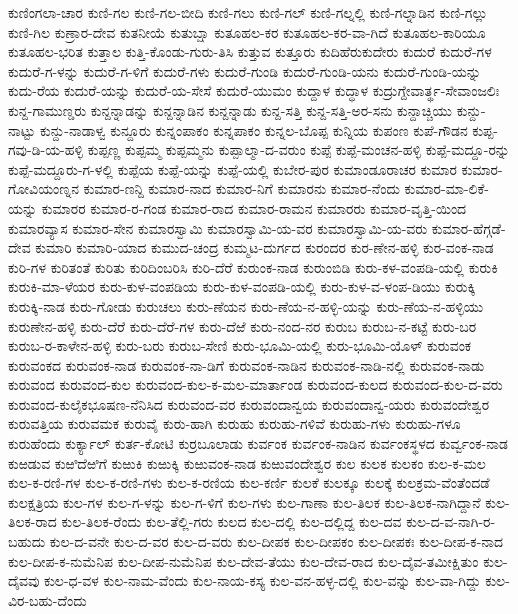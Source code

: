 ಕುಣಿಂಗಲಾ-ಚಾರ
ಕುಣಿ-ಗಲ
ಕುಣಿ-ಗಲ-ಬೀದಿ
ಕುಣಿ-ಗಲು
ಕುಣಿ-ಗಲ್
ಕುಣಿ-ಗಲ್ನಲ್ಲಿ
ಕುಣಿ-ಗಲ್ನಾಡಿನ
ಕುಣಿ-ಗಲ್ಲು
ಕುಣಿ-ಗಿಲ
ಕುಣ್ರಾರ-ದೇವ
ಕುತನೀಯೆ
ಕುತುಬ್ಷಾ
ಕುತೂಹಲ-ಕರ
ಕುತೂಹಲ-ಕರ-ವಾ-ಗಿದೆ
ಕುತೂಹಲ-ಕಾರಿಯೂ
ಕುತೂಹಲ-ಭರಿತ
ಕುತ್ತಾಲ
ಕುತ್ತಿ-ಕೊಂಡು-ಗುರು-ತಿಸಿ
ಕುತ್ತುವ
ಕುತ್ತೂರು
ಕುದಿಹೆರುಕುದೇರು
ಕುದುರೆ
ಕುದುರೆ-ಗಳ
ಕುದುರೆ-ಗ-ಳನ್ನು
ಕುದುರೆ-ಗ-ಳಿಗೆ
ಕುದುರೆ-ಗಳು
ಕುದುರೆ-ಗುಂಡಿ
ಕುದುರೆ-ಗುಂಡಿ-ಯನು
ಕುದುರೆ-ಗುಂಡಿ-ಯನ್ನು
ಕುದು-ರೆಯ
ಕುದುರೆ-ಯನ್ನು
ಕುದುರೆ-ಯ-ಸೇಸೆ
ಕುದುರೆ-ಯುಮಂ
ಕುದ್ದಾಳ
ಕುದ್ಧಾಳ
ಕುದ್ರುಗ್ದೇವಾರ್ತ್ಥ-ಸೇವಾಂಜಲಿಃ
ಕುನ್ದ-ಗಾಮುಣ್ಡರು
ಕುನ್ದನ್ನಾಡನ್ನು
ಕುನ್ದನ್ನಾಡಿನ
ಕುನ್ದನ್ನಾಡು
ಕುನ್ದ-ಸತ್ತಿ
ಕುನ್ದ-ಸತ್ತಿ-ಅರ-ಸನು
ಕುನ್ದಾಚ್ಚಿಯು
ಕುನ್ದು-ನಾಟ್ಟು
ಕುನ್ದು-ನಾಡಾಳ್ವ
ಕುನ್ದೂರು
ಕುನ್ನಂಪಾಕಂ
ಕುನ್ನಪಾಕಂ
ಕುನ್ನಲ-ಬೊಪ್ಪ
ಕುನ್ನಿಯ
ಕುಪಂಣ
ಕುಪೆ-ಗೌಡನ
ಕುಪ್ಪ-ಗವು-ಡಿ-ಯ-ಹಳ್ಳಿ
ಕುಪ್ಪಣ್ಣ
ಕುಪ್ಪಮ್ಮ
ಕುಪ್ಪಮ್ಮನು
ಕುಪ್ಪಾಲ್ಮಾ-ದ-ವರುಂ
ಕುಪ್ಪೆ
ಕುಪ್ಪೆ-ಮಂಚನ-ಹಳ್ಳಿ
ಕುಪ್ಪೆ-ಮದ್ದೂ-ರನ್ನು
ಕುಪ್ಪೆ-ಮದ್ದೂರು-ಗ-ಳಲ್ಲಿ
ಕುಪ್ಪೆಯ
ಕುಪ್ಪೆ-ಯನ್ನು
ಕುಪ್ಪೆ-ಯಲ್ಲಿ
ಕುಬೇರ-ಪುರ
ಕುಮಾಂಡೂರಾಚರ
ಕುಮಾರ
ಕುಮಾರ-ಗೋವಿಯಂಣ್ನನ
ಕುಮಾರ-ಣನ್ದಿ
ಕುಮಾರ-ನಾದ
ಕುಮಾರ-ನಿಗೆ
ಕುಮಾರನು
ಕುಮಾರ-ನೆಂದು
ಕುಮಾರ-ಮಾ-ಲಿಕೆ-ಯನ್ನು
ಕುಮಾರರ
ಕುಮಾರ-ರ-ಗಂಡ
ಕುಮಾರ-ರಾದ
ಕುಮಾರ-ರಾಮನ
ಕುಮಾರರು
ಕುಮಾರ-ವೃತ್ತಿ-ಯಿಂದ
ಕುಮಾರವ್ಯಾಸ
ಕುಮಾರ-ಸೇನ
ಕುಮಾರಸ್ವಾಮಿ
ಕುಮಾರಸ್ವಾಮಿ-ಯ-ವರ
ಕುಮಾರಸ್ವಾಮಿ-ಯ-ವರು
ಕುಮಾರ-ಹೆಗ್ಗಡೆ-ದೇವ
ಕುಮಾರಿ
ಕುಮಾರಿ-ಯಾದ
ಕುಮುದ-ಚಂದ್ರ
ಕುಮ್ಮಟ-ದುರ್ಗದ
ಕುರಂದರ
ಕುರ-ಣೇನ-ಹಳ್ಳಿ
ಕುರ-ವಂಕ-ನಾಡ
ಕುರಿ-ಗಳ
ಕುರಿತಂತೆ
ಕುರಿತು
ಕುರಿದಿಂಬರಿಸಿ
ಕುರಿ-ದೆರೆ
ಕುರುಂಕ-ನಾಡ
ಕುರುಂಬಿಡಿ
ಕುರು-ಕಳ-ವಂಪಡಿ-ಯಲ್ಲಿ
ಕುರುಕಿ
ಕುರುಕಿ-ಮಾ-ಳೆಯರ
ಕುರು-ಕುಳ-ವಂಪಡಿಯ
ಕುರು-ಕುಳ-ವಂಪಡಿ-ಯಲ್ಲಿ
ಕುರು-ಕುಳ-ವ-ಳಂಪ-ಡಿಯು
ಕುರುಕ್ಕಿ
ಕುರುಕ್ಕಿ-ನಾಡ
ಕುರು-ಗೋಡು
ಕುರುಚಲು
ಕುರು-ಣೆಯನ
ಕುರು-ಣೆಯ-ನ-ಹಳ್ಳಿ-ಯನ್ನು
ಕುರು-ಣೆಯ-ನ-ಹಳ್ಳಿಯು
ಕುರುಣೇನ-ಹಳ್ಳಿ
ಕುರು-ದೆರೆ
ಕುರು-ದೆರೆ-ಗಳ
ಕುರು-ದೆಱೆ
ಕುರು-ನಂದ-ನರ
ಕುರುಬ
ಕುರುಬ-ನ-ಕಟ್ಟೆ
ಕುರು-ಬರ
ಕುರುಬ-ರ-ಕಾಳೇನ-ಹಳ್ಳಿ
ಕುರು-ಬರು
ಕುರುಬ-ಸೇಣಿ
ಕುರು-ಭೂಮಿ-ಯಲ್ಲಿ
ಕುರು-ಭೂಮಿ-ಯೊಳ್
ಕುರುವಂಕ
ಕುರುವಂಕದ
ಕುರುವಂಕ-ನಾಡ
ಕುರುವಂಕ-ನಾ-ಡಿಗೆ
ಕುರುವಂಕ-ನಾಡಿನ
ಕುರುವಂಕ-ನಾಡಿ-ನಲ್ಲಿ
ಕುರುವಂಕ-ನಾಡು
ಕುರುವಂದ
ಕುರುವಂದ-ಕುಲ
ಕುರುವಂದ-ಕುಲ-ಕ-ಮಲ-ಮಾರ್ತಾಂಡ
ಕುರುವಂದ-ಕುಲದ
ಕುರುವಂದ-ಕುಲ-ದ-ವರು
ಕುರುವಂದ-ಕುಲೈಕಭೂಷಣ-ನೆನಿಸಿದ
ಕುರುವಂದ-ವರ
ಕುರುವಂದಾನ್ವಯ
ಕುರುವಂದಾನ್ವ-ಯರು
ಕುರುವಂದೇಶ್ವರ
ಕುರುವತ್ತಿಯ
ಕುರುವಮಕ
ಕುರುವೈ
ಕುರು-ಹಾಗಿ
ಕುರುಹು
ಕುರುಹು-ಗಳಿವೆ
ಕುರುಹು-ಗಳು
ಕುರುಹು-ಗಳೂ
ಕುರುಹೆಂದು
ಕುರ್ಕ್ಯಾಲ್
ಕುರ್ತ-ಕೋಟಿ
ಕುರ್ರಬೂಲಾಡು
ಕುರ್ವಂಕ
ಕುರ್ವಂಕ-ನಾಡಿನ
ಕುರ್ವಂಕಸ್ಥಳದ
ಕುರ್ವ್ವಂಕ-ನಾಡ
ಕುಱಡುವ
ಕುಱಿದೆಱಿಗೆ
ಕುಱುಕಿ
ಕುಱುಕ್ಕಿ
ಕುಱುವಂಕ-ನಾಡ
ಕುಱುವಂದೇಶ್ವರ
ಕುಲ
ಕುಲಕ
ಕುಲಕಂ
ಕುಲ-ಕ-ಮಲ
ಕುಲ-ಕ-ರಣಿ-ಗಳ
ಕುಲ-ಕ-ರಣಿ-ಗಳು
ಕುಲ-ಕ-ರಣಿಯ
ಕುಲ-ಕರ್ಣಿ
ಕುಲಕೆ
ಕುಲಕ್ಕೂ
ಕುಲಕ್ಕೆ
ಕುಲಕ್ರಮ-ವೆಂತೆಂದಡೆ
ಕುಲಕ್ಷತ್ರಿಯ
ಕುಲ-ಗಳ
ಕುಲ-ಗ-ಳನ್ನು
ಕುಲ-ಗ-ಳಿಗೆ
ಕುಲ-ಗಳು
ಕುಲ-ಗಾಣಾ
ಕುಲ-ತಿಲಕ
ಕುಲ-ತಿಲಕ-ನಾಗಿದ್ದಾನೆ
ಕುಲ-ತಿಲಕ-ರಾದ
ಕುಲ-ತಿಲಕ-ರೆಂದು
ಕುಲ-ತೆಲ್ಲಿ-ಗರು
ಕುಲದ
ಕುಲ-ದಲ್ಲಿ
ಕುಲ-ದಲ್ಲಿದ್ದ
ಕುಲ-ದವ
ಕುಲ-ದ-ವ-ನಾಗಿ-ರ-ಬಹುದು
ಕುಲ-ದ-ವನೇ
ಕುಲ-ದ-ವರ
ಕುಲ-ದ-ವರು
ಕುಲ-ದೀಪಕ
ಕುಲ-ದೀಪಕಂ
ಕುಲ-ದೀಪಕಃ
ಕುಲ-ದೀಪ-ಕ-ನಾದ
ಕುಲ-ದೀಪ-ಕ-ನುಮೆನಿಪ
ಕುಲ-ದೀಪ-ನುಮೆನಿಪ
ಕುಲ-ದೇವ-ತೆಯು
ಕುಲ-ದೇವ-ರಾದ
ಕುಲ-ದೈವ-ತಮೀಕ್ಷಿತುಂ
ಕುಲ-ದೈವವು
ಕುಲ-ಧ-ವಳ
ಕುಲ-ನಾಮ-ವೆಂದು
ಕುಲ-ನಾಯ-ಕಸ್ಯ
ಕುಲ-ವನ-ಹಳ್ಳ-ದಲ್ಲಿ
ಕುಲ-ವನ್ನು
ಕುಲ-ವಾ-ಗಿದ್ದು
ಕುಲ-ವಿರ-ಬಹು-ದೆಂದು
